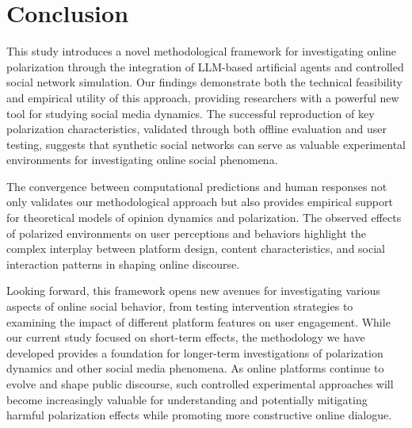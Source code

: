 \section{Conclusion}

This study introduces a novel methodological framework for investigating online polarization through the integration of LLM-based artificial agents and controlled social network simulation. Our findings demonstrate both the technical feasibility and empirical utility of this approach, providing researchers with a powerful new tool for studying social media dynamics. The successful reproduction of key polarization characteristics, validated through both offline evaluation and user testing, suggests that synthetic social networks can serve as valuable experimental environments for investigating online social phenomena.

The convergence between computational predictions and human responses not only validates our methodological approach but also provides empirical support for theoretical models of opinion dynamics and polarization. The observed effects of polarized environments on user perceptions and behaviors highlight the complex interplay between platform design, content characteristics, and social interaction patterns in shaping online discourse.

Looking forward, this framework opens new avenues for investigating various aspects of online social behavior, from testing intervention strategies to examining the impact of different platform features on user engagement. While our current study focused on short-term effects, the methodology we have developed provides a foundation for longer-term investigations of polarization dynamics and other social media phenomena. As online platforms continue to evolve and shape public discourse, such controlled experimental approaches will become increasingly valuable for understanding and potentially mitigating harmful polarization effects while promoting more constructive online dialogue.
